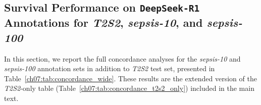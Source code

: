 \subsection{Survival Performance on \texttt{DeepSeek-R1} Annotations for \textit{T2S2}, \textit{sepsis-10}, and \textit{sepsis-100}}\label{ch07:apd:full_survival}


In this section, we report the full concordance analyses for the \textit{sepsis-10} and \textit{sepsis-100} annotation sets in addition to \textit{T2S2} test set, presented in Table~\ref{ch07:tab:concordance_wide}.
These results are the extended version of the \textit{T2S2}-only table (Table~\ref{ch07:tab:concordance_t2s2_only}) included in the main text.








